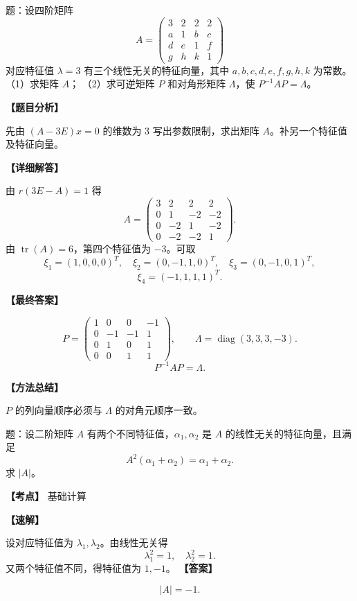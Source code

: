 ﻿\documentclass[11pt,a4paper,UTF8]{ctexart}
\begin{document}
\begin{answerbox}
题：设四阶矩阵
\[
A=\begin{pmatrix}
3&2&2&2\\
a&1&b&c\\
d&e&1&f\\
g&h&k&1
\end{pmatrix}
\]
对应特征值 $\lambda=3$ 有三个线性无关的特征向量，其中 $a,b,c,d,e,f,g,h,k$ 为常数。
（1）求矩阵 $A$；
（2）求可逆矩阵 $P$ 和对角形矩阵 $\Lambda$，使 $P^{-1}AP=\Lambda$。

\textbf{【题目分析】}

先由 $(A-3E)x=0$ 的维数为 $3$ 写出参数限制，求出矩阵 $A$。补另一个特征值及特征向量。

\textbf{【详细解答】}

由 \(r(3E-A)=1\) 得
\[
A=
\begin{pmatrix}
3&2&2&2\\
0&1&-2&-2\\
0&-2&1&-2\\
0&-2&-2&1
\end{pmatrix}.
\]
由 \(\operatorname{tr}(A)=6\)，第四个特征值为 \(-3\)。可取
\[
\xi_1=(1,0,0,0)^T,\quad
\xi_2=(0,-1,1,0)^T,\quad
\xi_3=(0,-1,0,1)^T,
\]
\[
\xi_4=(-1,1,1,1)^T.
\]

\textbf{【最终答案】}

\[
P=
\begin{pmatrix}
1&0&0&-1\\
0&-1&-1&1\\
0&1&0&1\\
0&0&1&1
\end{pmatrix},
\qquad
\Lambda=\operatorname{diag}(3,3,3,-3).
\]
\[
P^{-1}AP=\Lambda.
\]

\textbf{【方法总结】}

\(P\) 的列向量顺序必须与 \(\Lambda\) 的对角元顺序一致。
\end{answerbox}
\begin{answerbox}[2023--2024 填空 6]
题：设二阶矩阵 $A$ 有两个不同特征值，$\alpha_1,\alpha_2$ 是 $A$ 的线性无关的特征向量，且满足
\[A^2(\alpha_1+\alpha_2)=\alpha_1+\alpha_2.\]
求 $|A|$。

\textbf{【考点】} 基础计算

\textbf{【速解】}

设对应特征值为 $\lambda_1,\lambda_2$。由线性无关得
\[\lambda_1^2=1,\quad \lambda_2^2=1.\]
又两个特征值不同，得特征值为 $1,-1$。
\textbf{【答案】}

\[|A|=-1.\]
\end{answerbox}
\end{document}
